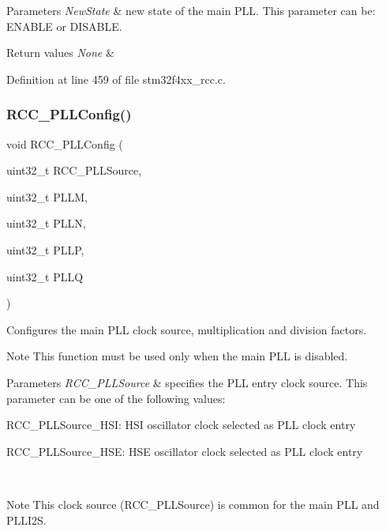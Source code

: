 \begin{DoxyParams}{Parameters}
{\em New\+State} & new state of the main P\+LL. This parameter can be\+: E\+N\+A\+B\+LE or D\+I\+S\+A\+B\+LE. \\
\hline
\end{DoxyParams}

\begin{DoxyRetVals}{Return values}
{\em None} & \\
\hline
\end{DoxyRetVals}


Definition at line 459 of file stm32f4xx\+\_\+rcc.\+c.

\mbox{\label{group___r_c_c_ga154b93e90bfdede2a874244a1ff1002e}} 
\subsubsection{\texorpdfstring{R\+C\+C\+\_\+\+P\+L\+L\+Config()}{RCC\_PLLConfig()}}
{\footnotesize\ttfamily void R\+C\+C\+\_\+\+P\+L\+L\+Config (\begin{DoxyParamCaption}\item[{uint32\+\_\+t}]{R\+C\+C\+\_\+\+P\+L\+L\+Source,  }\item[{uint32\+\_\+t}]{P\+L\+LM,  }\item[{uint32\+\_\+t}]{P\+L\+LN,  }\item[{uint32\+\_\+t}]{P\+L\+LP,  }\item[{uint32\+\_\+t}]{P\+L\+LQ }\end{DoxyParamCaption})}



Configures the main P\+LL clock source, multiplication and division factors. 

\begin{DoxyNote}{Note}
This function must be used only when the main P\+LL is disabled.
\end{DoxyNote}

\begin{DoxyParams}{Parameters}
{\em R\+C\+C\+\_\+\+P\+L\+L\+Source} & specifies the P\+LL entry clock source. This parameter can be one of the following values\+: \begin{DoxyItemize}
\item R\+C\+C\+\_\+\+P\+L\+L\+Source\+\_\+\+H\+SI\+: H\+SI oscillator clock selected as P\+LL clock entry \item R\+C\+C\+\_\+\+P\+L\+L\+Source\+\_\+\+H\+SE\+: H\+SE oscillator clock selected as P\+LL clock entry \end{DoxyItemize}
\\
\hline
\end{DoxyParams}
\begin{DoxyNote}{Note}
This clock source (R\+C\+C\+\_\+\+P\+L\+L\+Source) is common for the main P\+LL and P\+L\+L\+I2S.
\end{DoxyNote}

